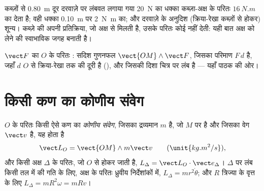 \begin{example}[दरवाज़ा]\label{ex:b1:angular-momentum:door}
कब्ज़ों से \qty{0.80}{m} दूर दरवाज़े पर लंबवत लगाया गया \qty{20}{N} का धक्का
कब्ज़ा-अक्ष के परितः $\qty{16}{N.m}$ का  देता है; वही धक्का
\qty{0.10}{m} पर \qty{2}{N.m} का; और दरवाज़े के अनुदिश (क्रिया-रेखा कब्ज़ों
से होकर) शून्य। कब्ज़े की अपनी प्रतिक्रिया, जो अक्ष से मिलती है, उसके परितः
कोई  नहीं देती: यही बात अक्ष को  लेने की स्वाभाविक जगह बनाती है।
\end{example}

\begin{omfigure}

{\small $\vect F$ का $O$ के परितः : सदिश गुणनफल
$\vect{OM}\wedge\vect F$, जिसका परिमाण $F\,d$ है, जहाँ $d$ $O$ से
क्रिया-रेखा तक की दूरी है (), और जिसकी दिशा चित्र पर लंब है
--- यहाँ पाठक की ओर।}
\end{omfigure}

\section{किसी कण का कोणीय संवेग}

\begin{definition}[कोणीय संवेग]\label{def:b1:angular-momentum:L}
$O$ के परितः किसी ऐसे कण का \emph{कोणीय संवेग}, जिसका द्रव्यमान $m$ है, जो
$M$ पर है और जिसका वेग $\vect v$ है, यह होता है
\[
\vect L_O = \vect{OM}\wedge m\vect v \qquad (\unit{kg.m^2/s}),
\]
और किसी अक्ष $\Delta$ के परितः, जो $O$ से होकर जाती है,
$L_\Delta = \vect L_O\cdot\vect e_\Delta$। $\Delta$ पर लंब किसी तल में की गति
के लिए, अक्ष के परितः ध्रुवीय निर्देशांकों में, $L_\Delta = mr^2\dot\theta$;
और $R$ त्रिज्या के वृत्त के लिए $L_\Delta = mR^2\omega = mRv$।
\end{definition}

